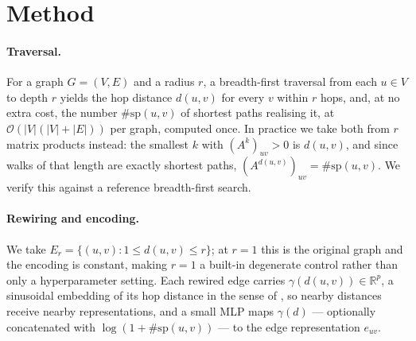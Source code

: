 \documentclass[11pt]{article}
\begin{document}
\section{Method}
\label{sec:method}

\paragraph{Traversal.}
For a graph $G=(V,E)$ and a radius $r$, a breadth-first traversal from each $u\in V$ to depth $r$
yields the hop distance $d(u,v)$ for every $v$ within $r$ hops, and, at no extra cost, the
number $\#\mathrm{sp}(u,v)$ of shortest paths realising it, at
$\mathcal{O}(|V|(|V|+|E|))$ per graph, computed once. In practice we take both from $r$ matrix
products instead: the smallest $k$ with $(A^k)_{uv}>0$ is $d(u,v)$, and since walks of that
length are exactly shortest paths, $(A^{d(u,v)})_{uv}=\#\mathrm{sp}(u,v)$. We verify this against
a reference breadth-first search.

\paragraph{Rewiring and encoding.}
We take $E_r=\{(u,v):1\le d(u,v)\le r\}$; at $r=1$ this is the original graph and the encoding is
constant, making $r=1$ a built-in degenerate control rather than only a hyperparameter setting.
Each rewired edge carries $\gamma(d(u,v))\in\mathbb{R}^{p}$, a sinusoidal embedding of its hop
distance in the sense of \citet{vaswani2017attention}, so nearby distances receive nearby
representations, and a small MLP maps $\gamma(d)$ --- optionally concatenated with
$\log(1+\#\mathrm{sp}(u,v))$ --- to the edge representation $e_{uv}$.
\end{document}
